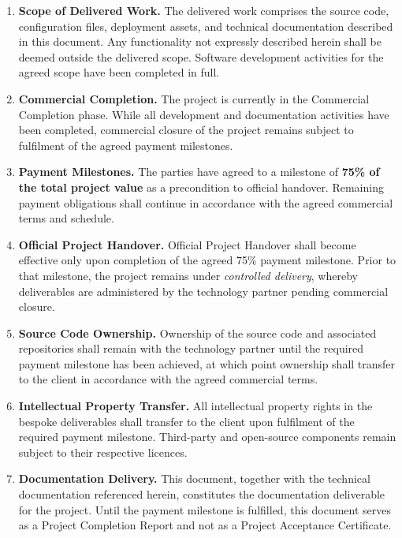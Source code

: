 \documentclass[11pt,a4paper]{article}
\begin{document}
\begin{enumerate}[leftmargin=*, itemsep=8pt]

    \item \textbf{Scope of Delivered Work.} The delivered work comprises the
    source code, configuration files, deployment assets, and technical
    documentation described in this document. Any functionality not expressly
    described herein shall be deemed outside the delivered scope. Software
    development activities for the agreed scope have been completed in full.

    \item \textbf{Commercial Completion.} The project is currently in the
    Commercial Completion phase. While all development and documentation
    activities have been completed, commercial closure of the project remains
    subject to fulfilment of the agreed payment milestones.

    \item \textbf{Payment Milestones.} The parties have agreed to a milestone
    of \textbf{75\% of the total project value} as a precondition to official
    handover. Remaining payment obligations shall continue in accordance with
    the agreed commercial terms and schedule.

    \item \textbf{Official Project Handover.} Official Project Handover shall
    become effective only upon completion of the agreed 75\% payment
    milestone. Prior to that milestone, the project remains under
    \emph{controlled delivery}, whereby deliverables are administered by the
    technology partner pending commercial closure.

    \item \textbf{Source Code Ownership.} Ownership of the source code and
    associated repositories shall remain with the technology partner until
    the required payment milestone has been achieved, at which point
    ownership shall transfer to the client in accordance with the agreed
    commercial terms.

    \item \textbf{Intellectual Property Transfer.} All intellectual property
    rights in the bespoke deliverables shall transfer to the client upon
    fulfilment of the required payment milestone. Third-party and open-source
    components remain subject to their respective licences.

    \item \textbf{Documentation Delivery.} This document, together with the
    technical documentation referenced herein, constitutes the documentation
    deliverable for the project. Until the payment milestone is fulfilled,
    this document serves as a Project Completion Report and not as a Project
    Acceptance Certificate.


\end{enumerate}
\end{document}
